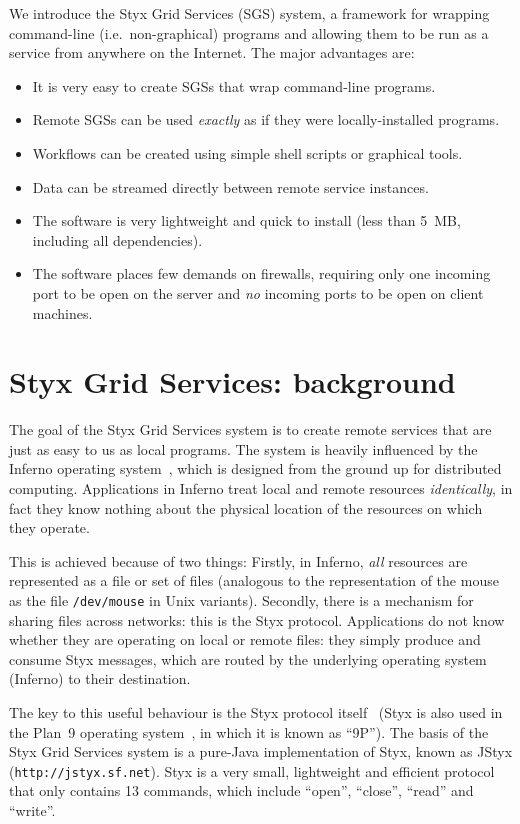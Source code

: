 \documentclass{llncs}
\begin{document}
We introduce the Styx Grid Services (SGS) system, a framework for wrapping command-line (i.e.\ non-graphical) programs and allowing them to be run as a service from anywhere on the Internet.  The major advantages are:
\begin{itemize}
  \item It is very easy to create SGSs that wrap command-line programs.
	\item Remote SGSs can be used {\em exactly\/} as if they were locally-installed programs.
	\item Workflows can be created using simple shell scripts or graphical tools.
	\item Data can be streamed directly between remote service instances.
	\item The software is very lightweight and quick to install (less than 5~MB, including all dependencies).
	\item The software places few demands on firewalls, requiring only one incoming port to be open on the server and {\em no\/} incoming ports to be open on client machines.
\end{itemize}


\section{Styx Grid Services: background}\label{sec:sgsoverview}
The goal of the Styx Grid Services system is to create remote services that are just as easy to us as local programs.  The system is heavily influenced by the Inferno operating system~\cite{Inferno}, which is designed from the ground up for distributed computing.  Applications in Inferno treat local and remote resources {\em identically\/}, in fact they know nothing about the physical location of the resources on which they operate.

This is achieved because of two things: Firstly, in Inferno, {\em all\/} resources are represented as a file or set of files (analogous to the representation of the mouse as the file {\tt /dev/mouse} in Unix variants).  Secondly, there is a mechanism for sharing files across networks: this is the Styx protocol.  Applications do not know whether they are operating on local or remote files: they simply produce and consume Styx messages, which are routed by the underlying operating system (Inferno) to their destination.

The key to this useful behaviour is the Styx protocol itself~\cite{Pike:1999} (Styx is also used in the Plan~9 operating system~\cite{Plan9}, in which it is known as ``9P'').  The basis of the Styx Grid Services system is a pure-Java implementation of Styx, known as JStyx ({\tt http://jstyx.sf.net}).  Styx is a very small, lightweight and efficient protocol that only contains 13 commands, which include ``open'', ``close'', ``read'' and ``write''.
\end{document}
